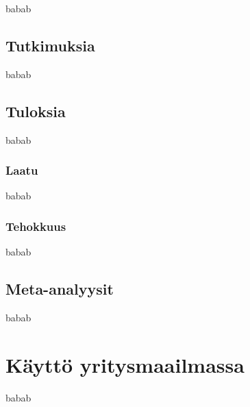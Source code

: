 \documentclass[finnish]{tktltiki2}
\theoremstyle{definition}
\theoremstyle{remark}
\begin{document}
babab


\subsection{Tutkimuksia}

babab




\subsection{Tuloksia}

babab

\subsubsection{Laatu}

babab

\subsubsection{Tehokkuus}

babab


\subsection{Meta-analyysit}


babab

\section{Käyttö yritysmaailmassa}


babab





%
%
% 
%









% 
\end{document}
